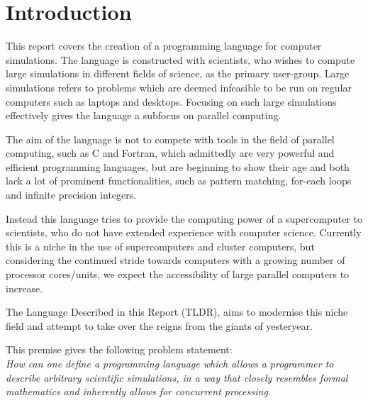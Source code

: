 \chapter{Introduction}\label{part:introduction}

This report covers the creation of a programming language for computer simulations. The language is constructed with scientists, who wishes to compute large simulations in different fields of science, as the primary user-group. Large simulations refers to problems which are deemed infeasible to be run on regular computers such as laptops and desktops. Focusing on such large simulations effectively gives the language a subfocus on parallel computing.

The aim of the language is not to compete with tools in the field of parallel computing, such as C and Fortran, which admittedly are very powerful and efficient programming languages, but are beginning to show their age and both lack a lot of prominent functionalities, such as pattern matching, for-each loops and infinite precision integers. 

Instead this language tries to provide the computing power of a supercomputer to scientists, who do not have extended experience with computer science. Currently this is a niche in the use of supercomputers and cluster computers, but considering the continued stride towards computers with a growing number of processor cores/units, we expect the accessibility of large parallel computers to increase. 

The Language Described in this Report (TLDR), aims to modernise this niche field and attempt to take over the reigns from the giants of yesteryear.

This premise gives the following problem statement:
\\

\emph{How can one define a programming language which allows a programmer to describe arbitrary scientific simulations, in a way that closely resembles formal mathematics and inherently allows for concurrent processing.}